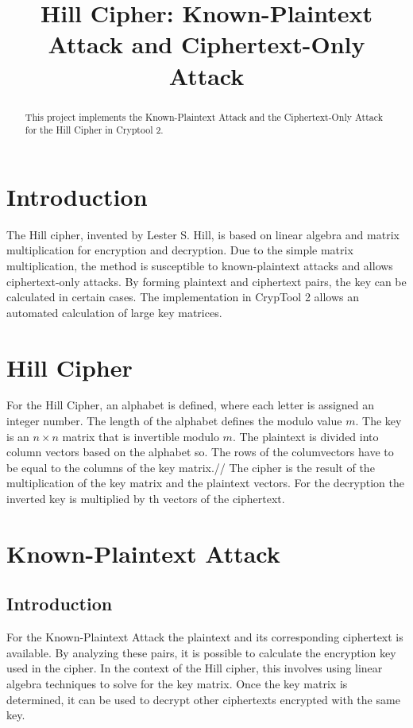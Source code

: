 \documentclass[conference]{IEEEtran}
\begin{document}
\title{Hill Cipher: Known-Plaintext Attack and Ciphertext-Only Attack\\}

\author{
}

\maketitle

\begin{abstract}
  This project implements the Known-Plaintext Attack and the Ciphertext-Only Attack for the Hill Cipher in Cryptool 2. 
\end{abstract}

\section{Introduction}
The Hill cipher, invented by Lester S. Hill, is based on linear algebra and matrix multiplication for encryption and decryption. 
Due to the simple matrix multiplication, the method is susceptible to known-plaintext attacks and allows ciphertext-only 
attacks. By forming plaintext and ciphertext pairs, the key can be calculated in certain cases. The implementation in CrypTool 2 
allows an automated calculation of large key matrices.

\section{Hill Cipher}

For the Hill Cipher, an alphabet is defined, where each letter is assigned an integer number. The length of the alphabet defines the modulo value \( m \). The key is an \( n \times n \) matrix that is invertible modulo \( m \). The plaintext is divided into column vectors based on the alphabet so. The rows of the columvectors have to be equal to the columns of the key matrix.//
The cipher is the result of the multiplication of the key matrix and the plaintext vectors. For the decryption the inverted key is multiplied by th vectors of the ciphertext.

\section{Known-Plaintext Attack}
\subsection{Introduction}
For the Known-Plaintext Attack the plaintext and its corresponding ciphertext is available. By analyzing these pairs, it is possible to calculate the encryption key used in the cipher. In the context of the Hill cipher, this involves using linear algebra techniques to solve for the key matrix. Once the key matrix is determined, it can be used to decrypt other ciphertexts encrypted with the same key.
\end{document}
